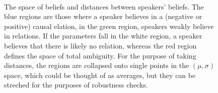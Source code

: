 \documentclass[12pt]{article}
\begin{document}
\begin{figure}
\begin{subfigure}[b]{0.5\textwidth}
                \label{fig:dist}
        \end{subfigure}
        ~ %
      \caption{The space of beliefs and distances between speakers' beliefs. The blue regions are those where a speaker believes in a (negative or positive) causal elation, in the green region, speakers weakly believe in relations. If the parameters fall in the white region, a speaker believes that there is likely no relation, whereas the red region defines the space of total ambiguity. For the purpose of taking distances, the regions are collapsed onto single points in the $(\mu, \sigma)$ space, which could be thought of as averages, but they can be streched for the purposes of robustness checks.}\label{fig:belief_space}  
\end{figure}

          
\end{document}
